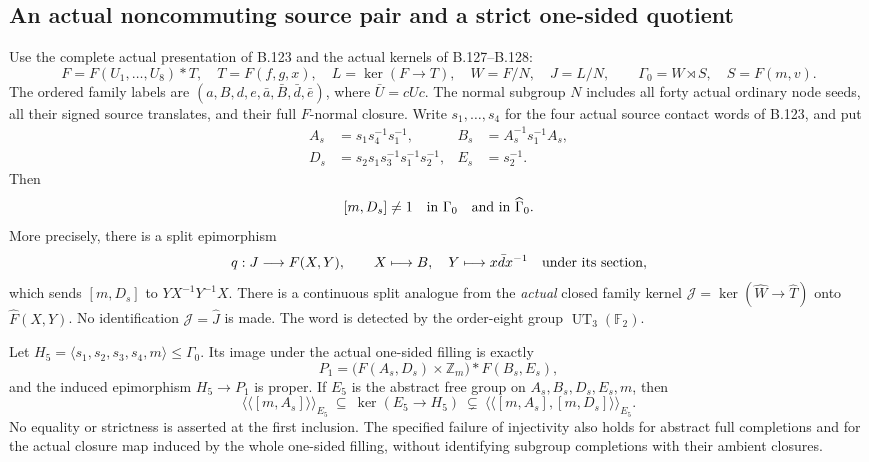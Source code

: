 \subsection*{An actual noncommuting source pair and a strict one-sided quotient}

\label{stmt:B131}
Use the complete actual presentation of B.123 and the actual kernels of
B.127--B.128:
\[
 F=F(U_1,\ldots,U_8)*T,\quad T=F(f,g,x),\quad
 L=\ker(F\to T),\quad W=F/N,\quad J=L/N,
 \qquad \Gamma_0=W\rtimes S,\quad S=F(m,v).
\]
The ordered family labels are
$(a,B,d,e,\bar a,\bar B,\bar d,\bar e)$, where
$\bar U=cUc$. The normal subgroup $N$ includes all forty actual ordinary
node seeds, all their signed source translates, and their full
$F$-normal closure. Write $s_1,\ldots,s_4$ for the four actual source
contact words of B.123, and put
\begin{equation}\label{eq:B131-contact-basis}
\begin{aligned}
 A_s&=s_1s_4^{-1}s_1^{-1},&
 B_s&=A_s^{-1}s_1^{-1}A_s,\\
 D_s&=s_2s_1s_3^{-1}s_1^{-1}s_2^{-1},&
 E_s&=s_2^{-1}.
\end{aligned}
\end{equation}
Then
\begin{equation}\label{eq:B131-noncommutation}
 [m,D_s]\ne1\quad\hbox{in }\Gamma_0
 \quad\hbox{and in }\widehat\Gamma_0.
\end{equation}
More precisely, there is a split epimorphism
\begin{equation}\label{eq:B131-free-retract}
 q:J\longrightarrow F(X,Y),\qquad
 X\longmapsto B,\quad Y\longmapsto x\bar d x^{-1}
 \quad\hbox{under its section},
\end{equation}
which sends $[m,D_s]$ to $YX^{-1}Y^{-1}X$. There is a continuous split
analogue from the \emph{actual} closed family kernel
$\mathcal J=\ker(\widehat W\to\widehat T)$ onto
$\widehat F(X,Y)$. No identification $\mathcal J=\widehat J$ is made.
The word is detected by the order-eight group $\operatorname{UT}_3(\mathbb F_2)$.

Let $H_5=\langle s_1,s_2,s_3,s_4,m\rangle\leq\Gamma_0$.
Its image under the actual one-sided filling is exactly
\begin{equation}\label{eq:B131-one-sided-group}
 P_1=\bigl(F(A_s,D_s)\times\mathbb Z_m\bigr)*F(B_s,E_s),
\end{equation}
and the induced epimorphism $H_5\to P_1$ is proper. If $E_5$ is the
abstract free group on $A_s,B_s,D_s,E_s,m$, then
\begin{equation}\label{eq:B131-kernel-sandwich}
 \langle\!\langle[m,A_s]\rangle\!\rangle_{E_5}
 \ \subseteq\ \ker(E_5\to H_5)
 \ \subsetneq\
 \langle\!\langle[m,A_s],[m,D_s]\rangle\!\rangle_{E_5}.
\end{equation}
No equality or strictness is asserted at the first inclusion. The
specified failure of injectivity also holds for abstract full completions
and for the actual closure map induced by the whole one-sided filling,
without identifying subgroup completions with their ambient closures.

